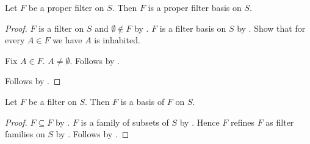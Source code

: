 \begin{proposition}\label{filter_is_proper_filter_basis}
    Let $F$ be a proper filter on $S$.
    Then $F$ is a proper filter basis on $S$.
\end{proposition}
\begin{proof}
    $F$ is a filter on $S$ and $\emptyset\notin F$
        by .
    $F$ is a filter basis on $S$ by .
    Show that for every $A\in F$ we have $A$ is inhabited.
    \begin{subproof}
        Fix $A\in F$.
        $A\neq\emptyset$.
        Follows by .
    \end{subproof}
    Follows by .
\end{proof}

\begin{proposition}\label{filter_is_basis_of_itself}
    Let $F$ be a filter on $S$.
    Then $F$ is a basis of $F$ on $S$.
\end{proposition}
\begin{proof}
    $F\subseteq F$ by .
    $F$ is a family of subsets of $S$ by .
    Hence $F$ refines $F$ as filter families on $S$
        by .
    Follows by .
\end{proof}

